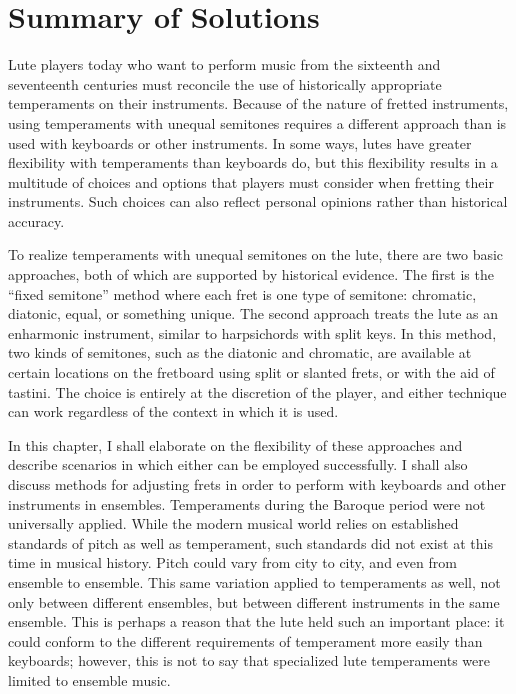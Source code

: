 \chapter{Summary of Solutions}

Lute players today who want to perform music from the sixteenth and seventeenth centuries must reconcile the use of
historically appropriate temperaments on their instruments. Because of the nature of fretted instruments, using
temperaments with unequal semitones requires a different approach than is used with keyboards or other instruments. In
some ways, lutes have greater flexibility with temperaments than keyboards do, but this flexibility results in a
multitude of choices and options that players must consider when fretting their instruments. Such choices can also
reflect personal opinions rather than historical accuracy.

To realize temperaments with unequal semitones on the lute, there are two basic approaches, both of which are supported
by historical evidence. The first is the ``fixed semitone'' method where each fret is one type of semitone: chromatic,
diatonic, equal, or something unique. The second approach treats the lute as an enharmonic instrument, similar to
harpsichords with split keys. In this method, two kinds of semitones, such as the diatonic and chromatic, are available
at certain locations on the fretboard using split or slanted frets, or with the aid of tastini. The choice is entirely
at the discretion of the player, and either technique can work regardless of the context in which it is used.

In this chapter, I shall elaborate on the flexibility of these approaches and describe scenarios in which either can be
employed successfully. I shall also discuss methods for adjusting frets in order to perform with keyboards and other
instruments in ensembles. Temperaments during the Baroque period were not universally applied. While the modern
musical world relies on established standards of pitch as well as temperament, such standards did not exist at this time
in musical history. Pitch could vary from city to city, and even from ensemble to ensemble. This same variation applied
to temperaments as well, not only between different ensembles, but between different instruments in the same ensemble.
This is perhaps a reason that the lute held such an important place: it could conform to the different requirements of
temperament more easily than keyboards; however, this is not to say that specialized lute temperaments were limited to
ensemble music.

